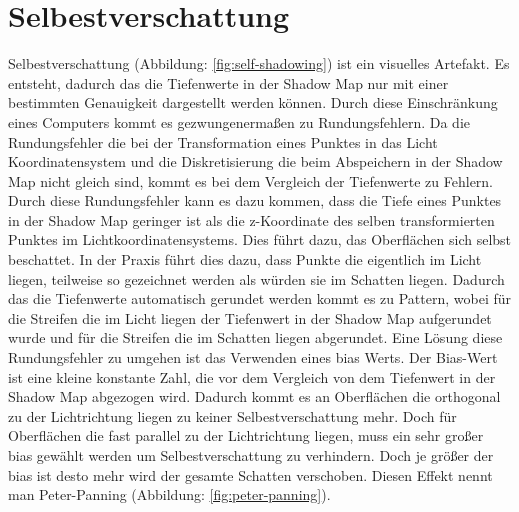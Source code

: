\section{Selbestverschattung}
\label{section:self-shadow}
Selbestverschattung (Abbildung: \ref{fig:self-shadowing}) ist ein visuelles Artefakt.
Es entsteht, dadurch das die Tiefenwerte in der Shadow Map nur mit einer bestimmten Genauigkeit dargestellt werden können.
Durch diese Einschränkung eines Computers kommt es gezwungenermaßen zu Rundungsfehlern.
Da die Rundungsfehler die bei der Transformation eines Punktes in das Licht Koordinatensystem und die Diskretisierung
die beim Abspeichern in der Shadow Map nicht gleich sind, kommt es bei dem Vergleich der Tiefenwerte zu Fehlern.
Durch diese Rundungsfehler kann es dazu kommen, dass die Tiefe eines Punktes in der Shadow Map geringer ist 
als die z-Koordinate des selben transformierten Punktes im Lichtkoordinatensystems.
Dies führt dazu, das Oberflächen sich selbst beschattet.
In der Praxis führt dies dazu, dass Punkte die eigentlich im Licht liegen, 
teilweise so gezeichnet werden als würden sie im Schatten liegen.
Dadurch das die Tiefenwerte automatisch gerundet werden kommt es zu Pattern, wobei für die Streifen
die im Licht liegen der Tiefenwert in der Shadow Map aufgerundet wurde und für 
die Streifen die im Schatten liegen abgerundet.
\newline \newline
Eine Lösung diese Rundungsfehler zu umgehen ist das Verwenden eines bias Werts.
Der Bias-Wert ist eine kleine konstante Zahl, die vor dem Vergleich von 
dem Tiefenwert in der Shadow Map abgezogen wird. 
Dadurch kommt es an Oberflächen die orthogonal zu der Lichtrichtung liegen 
zu keiner Selbestverschattung mehr.
Doch für Oberflächen die fast parallel zu der Lichtrichtung liegen, muss ein sehr großer bias gewählt werden
um Selbestverschattung zu verhindern.
Doch je größer der bias ist desto mehr wird der gesamte Schatten verschoben.
Diesen Effekt nennt man Peter-Panning (Abbildung: \ref{fig:peter-panning}).

